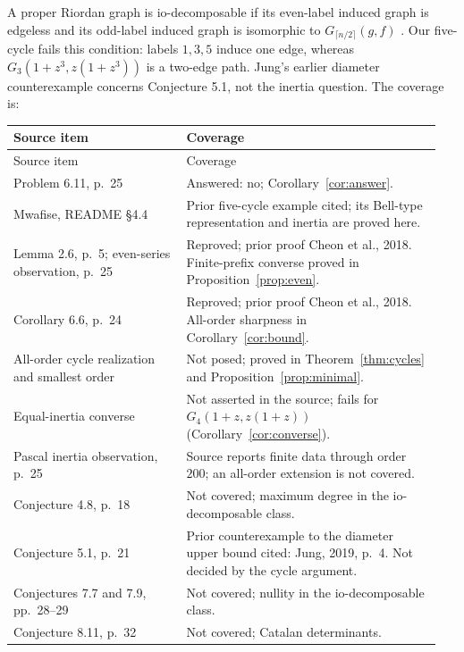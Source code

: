 \documentclass[11pt]{article}
\begin{document}
A proper Riordan graph is io-decomposable if its even-label induced
graph is edgeless and its odd-label induced graph is isomorphic to
$G_{\lceil n/2\rceil}(g,f)$ \cite[Definition 2.9, p.~6]{CJKM}.
Our five-cycle fails this condition: labels $1,3,5$ induce one edge,
whereas $G_3(1+z^3,z(1+z^3))$ is a two-edge path.
Jung's earlier diameter counterexample \cite[p.~4]{Jung} concerns
Conjecture 5.1, not the inertia question. The coverage is:
\begingroup
\small
\begin{longtable}{@{}p{0.38\linewidth}p{0.57\linewidth}@{}}
\toprule
Source item & Coverage\\\midrule
\endfirsthead
\toprule Source item & Coverage\\\midrule
\endhead
Problem 6.11, p.~25 & Answered: no; Corollary~\ref{cor:answer}.\\
Mwafise, README \S4.4 & Prior five-cycle example cited; its Bell-type
representation and inertia are proved here.\\
Lemma 2.6, p.~5; even-series observation, p.~25 & Reproved;
prior proof Cheon et al., 2018. Finite-prefix converse proved in
Proposition~\ref{prop:even}.\\
Corollary 6.6, p.~24 & Reproved; prior proof Cheon et al., 2018.
All-order sharpness in Corollary~\ref{cor:bound}.\\
All-order cycle realization and smallest order & Not posed; proved in
Theorem~\ref{thm:cycles} and Proposition~\ref{prop:minimal}.\\
Equal-inertia converse & Not asserted in the source; fails for
$G_4(1+z,z(1+z))$ (Corollary~\ref{cor:converse}).\\
Pascal inertia observation, p.~25 & Source reports finite data through
order $200$; an all-order extension is not covered.\\
Conjecture 4.8, p.~18 & Not covered; maximum degree in the
io-decomposable class.\\
Conjecture 5.1, p.~21 & Prior counterexample to the diameter upper
bound cited: Jung, 2019, p.~4. Not decided by the cycle argument.\\
Conjectures 7.7 and 7.9, pp.~28--29 & Not covered; nullity in the
io-decomposable class.\\
Conjecture 8.11, p.~32 & Not covered; Catalan determinants.\\
\bottomrule
\end{longtable}
\endgroup

\begingroup\sloppy
\end{document}
